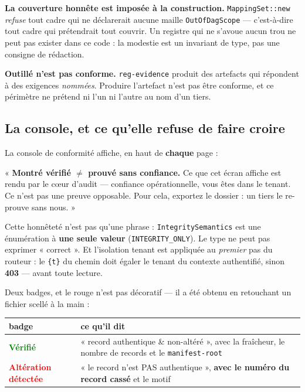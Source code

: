 \documentclass[10pt]{report}
\newcommand{\code}[1]{\texttt{\small #1}}
\newcommand{\ok}[1]{\textcolor{green}{\textbf{#1}}}
\newcommand{\ko}[1]{\textcolor{red}{\textbf{#1}}}
\newcommand{\att}[1]{\textcolor{amber}{\textbf{#1}}}
\begin{document}
\begin{acquis}
\textbf{La couverture honnête est imposée à la construction.} \code{MappingSet::new} \emph{refuse}
tout cadre qui ne déclarerait aucune maille \code{OutOfDagScope} --- c'est-à-dire tout cadre qui
prétendrait tout couvrir. Un registre qui ne s'avoue aucun trou ne peut pas exister dans ce code :
la modestie est un invariant de type, pas une consigne de rédaction.
\end{acquis}

\begin{these}
\textbf{Outillé n'est pas conforme.} \code{reg-evidence} produit des artefacts qui répondent à des
exigences \emph{nommées}. Produire l'artefact n'est pas être conforme, et ce périmètre ne prétend
ni l'un ni l'autre au nom d'un tiers.
\end{these}

\subsection{La console, et ce qu'elle refuse de faire croire}

La console de conformité affiche, en haut de \textbf{chaque} page :

\begin{these}
« \textbf{Montré vérifié $\neq$ prouvé sans confiance.} Ce que cet écran affiche est rendu par le
cœur d'audit --- confiance opérationnelle, vous êtes dans le tenant. Ce n'est pas une preuve
opposable. Pour cela, exportez le dossier : un tiers le re-prouve sans nous. »
\end{these}

Cette honnêteté n'est pas qu'une phrase : \code{IntegritySemantics} est une énumération à
\textbf{une seule valeur} (\code{INTEGRITY\_ONLY}). Le type ne peut pas exprimer « correct ». Et
l'isolation tenant est appliquée au \emph{premier} pas du routeur : le \code{\{t\}} du chemin doit
égaler le tenant du contexte authentifié, sinon \att{403} --- avant toute lecture.

Deux badges, et le rouge n'est pas décoratif --- il a été obtenu en retouchant un fichier scellé à
la main :

\begin{longtable}{@{}p{4.8cm} p{10.2cm}@{}}
\toprule \textbf{badge} & \textbf{ce qu'il dit} \\ \midrule \endhead
\ok{Vérifié} & « record authentique \& non-altéré », avec la fraîcheur, le nombre de records et le \code{manifest-root} \\
\ko{Altération détectée} & « le record n'est PAS authentique », \textbf{avec le numéro du record cassé} et le motif \\
\bottomrule
\end{longtable}
\end{document}
